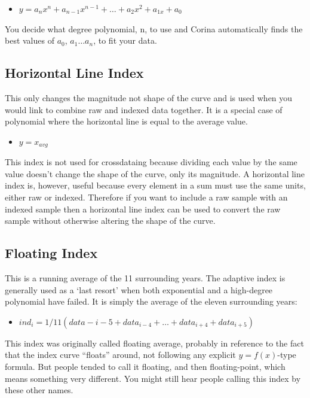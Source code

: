 \begin{itemize}
\item $y = a_{n}x^{n} + a_{n-1}x^{n-1} + \dots + a_{2}x^{2} + a_{1x} + a_{0}$ 
\end{itemize}

You decide what degree polynomial, n, to use and Corina automatically finds the best values of $a_{0}$, $a_{1} \dots a_{n}$, to fit your data. 

\subsection{Horizontal Line Index}
This only changes the magnitude not shape of the curve and is used when you would link to combine raw and indexed data together.  It is a special case of polynomial where the horizontal line is equal to the average value. 

\begin{itemize}
\item $y = x_{avg}$
\end{itemize}

This index is not used for crossdataing because dividing each value by the same value doesn't change the shape of the curve, only its magnitude. A horizontal line index is, however, useful because every element in a sum must use the same units, either raw or indexed. Therefore if you want to include a raw sample with an indexed sample then a horizontal line index can be used to convert the raw sample without otherwise altering the shape of the curve. 

\subsection{Floating Index}
This is a running average of the 11 surrounding years. The adaptive index is generally used as a `last resort' when both exponential and a high-degree polynomial have failed. It is simply the average of the eleven surrounding years:

\begin{itemize}
\item $ind_{i} = 1/11 (data-{i-5} + data_{i-4} + \dots + data_{i+4} + data_{i+5})$ 
\end{itemize}

This index was originally called floating average, probably in reference to the fact that the index curve ``floats'' around, not following any explicit $y=f(x)$-type formula. But people tended to call it floating, and then floating-point, which means something very different. You might still hear people calling this index by these other names.

